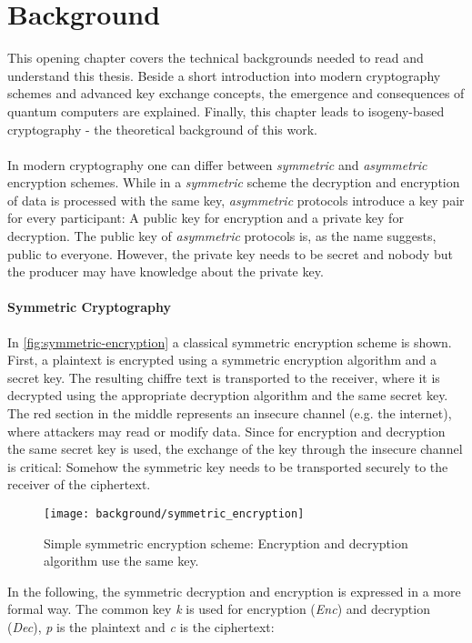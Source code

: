 \chapter{Background}\label{chapter:background}
This opening chapter covers the technical backgrounds needed to read and understand this thesis. Beside a short introduction into modern cryptography schemes and advanced key exchange concepts, the emergence and consequences of quantum computers are explained. Finally, this chapter leads to isogeny-based cryptography - the theoretical background of this work.
\\\\
In modern cryptography one can differ between \textit{symmetric} and \textit{asymmetric} encryption schemes. While in a \textit{symmetric} scheme the decryption and encryption of data is processed with the same key, \textit{asymmetric} protocols introduce a key pair for every participant: A public key for encryption and a private key for decryption. The public key of \textit{asymmetric} protocols is, as the name suggests, public to everyone. However, the private key needs to be secret and nobody but the producer may have knowledge about the private key.

\subsubsection{Symmetric Cryptography}

In \autoref{fig:symmetric-encryption} a classical symmetric encryption scheme is shown. First, a plaintext is encrypted using a symmetric encryption algorithm and a secret key. The resulting chiffre text is transported to the receiver, where it is decrypted using the appropriate decryption algorithm and the same secret key. The red section in the middle represents an insecure channel (e.g. the internet), where attackers may read or modify data. Since for encryption and decryption the same secret key is used, the exchange of the key through the insecure channel is critical: Somehow the symmetric key needs to be transported securely to the receiver of the ciphertext.

\begin{figure}[htpb]
  \centering
  \texttt{[image: background/symmetric\_encryption]}
  \caption[Symmetric encryption scheme]{Simple symmetric encryption scheme: Encryption and decryption algorithm use the same key.} \label{fig:symmetric-encryption}
\end{figure}
In the following, the symmetric decryption and encryption is expressed in a more formal way. The common key \textit{k} is used for encryption (\textit{Enc}) and decryption (\textit{Dec}), \textit{p} is the plaintext and \textit{c} is the ciphertext:

